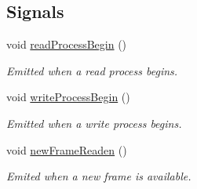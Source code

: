 \subsection*{Signals}
\begin{DoxyCompactItemize}
\item 
void \hyperlink{classmdt_port_thread_helper_a78007ee41a04ffde474087a80858c0ce}{read\-Process\-Begin} ()
\begin{DoxyCompactList}\small\item\em Emitted when a read process begins. \end{DoxyCompactList}\item 
void \hyperlink{classmdt_port_thread_helper_a80df5929776f6c617b96f2184e2bc96d}{write\-Process\-Begin} ()
\begin{DoxyCompactList}\small\item\em Emitted when a write process begins. \end{DoxyCompactList}\item 
void \hyperlink{classmdt_port_thread_helper_a751006665ed9f110ade8ced5264a5f50}{new\-Frame\-Readen} ()
\begin{DoxyCompactList}\small\item\em Emited when a new frame is available. \end{DoxyCompactList}\end{DoxyCompactItemize}
